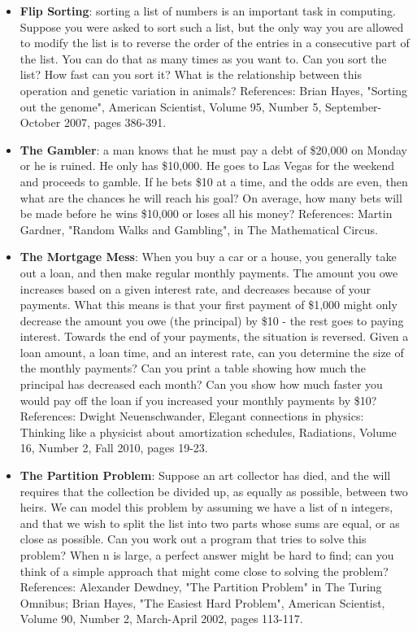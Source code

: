 \documentclass{article}
\begin{document}
\begin{itemize}
\item \textbf{Flip Sorting}: sorting a list of numbers is an important task in computing. Suppose you were asked to sort such a list, but the only way you are allowed to modify the list is to reverse the order of the entries in a consecutive part of the list. You can do that as many times as you want to. Can you sort the list? How fast can you sort it? What is the relationship between this operation and genetic variation in animals? References: Brian Hayes, "Sorting out the genome", American Scientist, Volume 95, Number 5, September-October 2007, pages 386-391.

\item \textbf{The Gambler}: a man knows that he must pay a debt of \$20,000 on Monday or he is ruined. He only has \$10,000. He goes to Las Vegas for the weekend and proceeds to gamble. If he bets \$10 at a time, and the odds are even, then what are the chances he will reach his goal? On average, how many bets will be made before he wins \$10,000 or loses all his money? References: Martin Gardner, "Random Walks and Gambling", in The Mathematical Circus.

\item \textbf{The Mortgage Mess}: When you buy a car or a house, you generally take out a loan, and then make regular monthly payments. The amount you owe increases based on a given interest rate, and decreases because of your payments. What this means is that your first payment of \$1,000 might only decrease the amount you owe (the principal) by \$10 - the rest goes to paying interest. Towards the end of your payments, the situation is reversed. Given a loan amount, a loan time, and an interest rate, can you determine the size of the monthly payments? Can you print a table showing how much the principal has decreased each month? Can you show how much faster you would pay off the loan if you increased your monthly payments by \$10? References: Dwight Neuenschwander, Elegant connections in physics: Thinking like a physicist about amortization schedules, Radiations, Volume 16, Number 2, Fall 2010, pages 19-23.

\item \textbf{The Partition Problem}: Suppose an art collector has died, and the will requires that the collection be divided up, as equally as possible, between two heirs. We can model this problem by assuming we have a list of n integers, and that we wish to split the list into two parts whose sums are equal, or as close as possible. Can you work out a program that tries to solve this problem? When n is large, a perfect answer might be hard to find; can you think of a simple approach that might come close to solving the problem? References: Alexander Dewdney, "The Partition Problem" in The Turing Omnibus; Brian Hayes, "The Easiest Hard Problem", American Scientist, Volume 90, Number 2, March-April 2002, pages 113-117.


\end{itemize}
\end{document}
